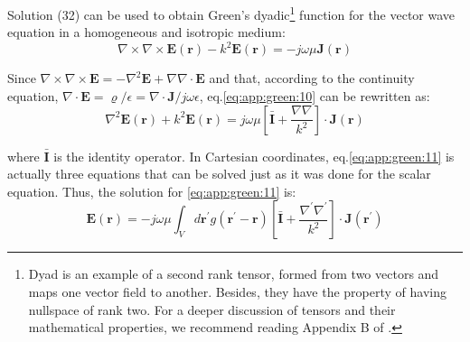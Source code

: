 			Solution (32) can be used to obtain Green's dyadic\footnote{Dyad is an example of a second rank tensor, formed from two vectors and maps one vector field to another. Besides, they have the property of having nullspace of rank two. For a deeper discussion of tensors and their mathematical properties, we recommend reading Appendix B of \citep{chew1995}.} function for the vector wave equation in a homogeneous and isotropic medium:
			\begin{equation}
				\nabla\times\nabla\times\mathbf{E}(\mathbf{r})-k^2\mathbf{E}(\mathbf{r}) = -j\omega\mu\mathbf{J}(\mathbf{r}) \label{eq:app:green:10}
			\end{equation}
	
			Since $\nabla\times\nabla\times\mathbf{E} = -\nabla^2\mathbf{E} + \nabla\nabla\cdot\mathbf{E}$ and that, according to the continuity equation, $\nabla\cdot\mathbf{E} = \varrho/\epsilon = \nabla\cdot\mathbf{J}/j\omega\epsilon$, eq.\eqref{eq:app:green:10} can be rewritten as:
			\begin{equation}
				\nabla^2\mathbf{E}(\mathbf{r}) + k^2\mathbf{E}(\mathbf{r}) = j\omega\mu\left[\mathbf{\bar{I}}+\frac{\nabla\nabla}{k^2}\right]\cdot\mathbf{J}(\mathbf{r}) \label{eq:app:green:11}
			\end{equation}
	
			\noindent where $\mathbf{\bar{I}}$ is the identity operator. In Cartesian coordinates, eq.\eqref{eq:app:green:11} is actually three equations that can be solved just as it was done for the scalar equation. Thus, the solution for \eqref{eq:app:green:11} is:
			\begin{equation}
				\mathbf{E}(\mathbf{r}) = -j\omega\mu\int_V d\mathbf{r^\prime} g(\mathbf{r^\prime}-\mathbf{r})\left[\mathbf{\bar{I}}+\frac{\nabla^\prime\nabla^\prime}{k^2}\right]\cdot\mathbf{J}(\mathbf{r^\prime}) \label{eq:app:green:12}
			\end{equation}
	
